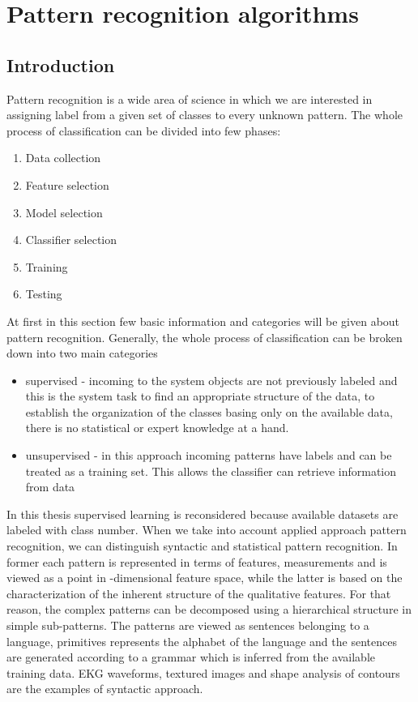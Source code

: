 \section{Pattern recognition algorithms}
\label{cha:Introduction}
\subsection{Introduction}
Pattern recognition is a wide area of science in which we are interested in
assigning label from a given set of classes to every unknown pattern. The whole 
process of classification can be divided into few phases:
\begin{enumerate}
    \item Data collection
    \item Feature selection
    \item Model selection
    \item Classifier selection
    \item Training 
    \item Testing
\end{enumerate}
At first in this section few basic information and categories will be given 
about pattern recognition. Generally, the whole process of classification
can be broken down into two main categories
\begin{itemize}
    \item supervised - incoming to the system objects are not previously
        labeled and this is the system task to find an appropriate structure of
        the data, to establish the organization of the classes basing only on
        the available data, there is no statistical or expert knowledge at a
        hand.
    \item unsupervised - in this approach incoming patterns have labels and can
        be treated as a training set. This allows the classifier can retrieve
        information from data 
\end{itemize}
In this thesis supervised learning is reconsidered because available datasets 
are labeled with class number. When we take into account applied approach
pattern recognition, we can distinguish syntactic and statistical 
pattern recognition. In former each pattern is represented in terms of 
 features, measurements and is viewed as a point in
-dimensional feature space, while the latter
is  based on the characterization of the inherent structure of the 
qualitative features. For that  reason, the complex patterns can be
decomposed using a hierarchical structure in simple  sub-patterns.
The patterns are viewed as sentences belonging to a language, primitives
represents the alphabet of the language and the sentences are generated
according to a grammar which is inferred from the available training data.
EKG waveforms, textured images and shape analysis of contours are the examples
of syntactic approach.

